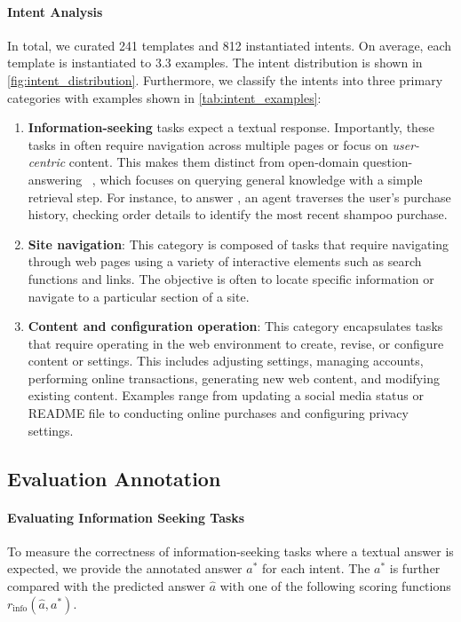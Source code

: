 \paragraph{Intent Analysis} In total, we curated 241 templates and 812 instantiated intents.
On average, each template is instantiated to 3.3 examples. 
The intent distribution is shown in \autoref{fig:intent_distribution}. 
Furthermore, we classify the intents into three primary categories with examples shown in \autoref{tab:intent_examples}:
\begin{enumerate}[label=(\arabic*),leftmargin=20pt,noitemsep]
    \item \textbf{Information-seeking} tasks expect a textual response. Importantly, these tasks in \ours often require navigation across multiple pages or focus on \emph{user-centric} content. This makes them distinct from open-domain question-answering ~\citep{yang2018hotpotqa,kwiatkowski2019natural}, which focuses on querying general knowledge with a simple retrieval step. For instance, to answer , an agent traverses the user's purchase history, checking order details to identify the most recent shampoo purchase.
    \item \textbf{Site navigation}: This category is composed of tasks that require navigating through web pages using a variety of interactive elements such as search functions and links. The objective is often to locate specific information or navigate to a particular section of a site.
    \item \textbf{Content and configuration operation}: This category encapsulates tasks that require operating in the web environment to create, revise, or configure content or settings. This includes adjusting settings, managing accounts, performing online transactions, generating new web content, and modifying existing content. Examples range from updating a social media status or README file to conducting online purchases and configuring privacy settings.
\end{enumerate}

\subsection{Evaluation Annotation}\label{sec:eval_annotation}
\paragraph{Evaluating Information Seeking Tasks} To measure the correctness of information-seeking tasks where a textual answer is expected, we provide the annotated answer $a^*$ for each intent. 
The $a^*$ is further compared with the predicted answer $\hat{a}$ with one of the following scoring functions $r_{\textrm{info}}(\hat{a}, a^*)$.

